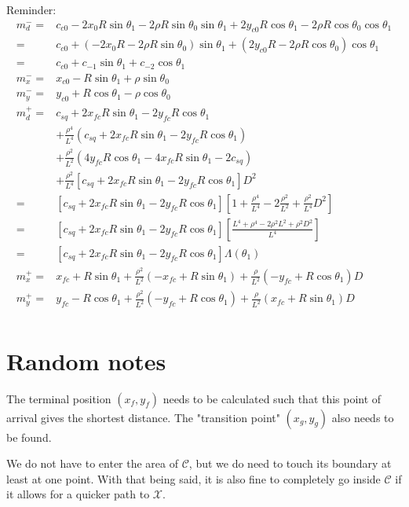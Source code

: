 \documentclass[12pt]{article}
\begin{document}
Reminder:
\begin{align}
    m_d^- =& c_{c0} - 2x_0R\sin\theta_1 - 2\rho R\sin\theta_0\sin\theta_1 + 2y_{c0}R\cos\theta_1 -2\rho R\cos\theta_0\cos\theta_1\\
    =& c_{c0} +(- 2x_0R - 2\rho R\sin\theta_0)\sin\theta_1 + (2y_{c0}R -2\rho R\cos\theta_0)\cos\theta_1\\
    =& c_{c0} +c_{-1}\sin\theta_1 + c_{-2}\cos\theta_1\\
    m^-_x =& x_{c0} -R\sin\theta_1 +\rho\sin\theta_0\\
    m^-_y =& y_{c0} + R\cos\theta_1 - \rho\cos\theta_0\\
    m_d^+ =& c_{sq} +2x_{fc}R\sin\theta_1  -2y_{fc}R\cos\theta_1 \nonumber\\
    &+   \frac{\rho^4}{L^4} (c_{sq} + 2x_{fc}R\sin\theta_1 -2y_{fc}R\cos\theta_1) \nonumber\\
    &+ \frac{\rho^2}{L^2} ( 4y_{fc} R\cos\theta_1  - 4x_{fc} R\sin\theta_1 -2c_{sq} ) \nonumber\\
    &+\frac{\rho^2}{L^4}[ c_{sq} + 2x_{fc}R\sin\theta_1  -2y_{fc}R\cos\theta_1  ]D^2\\
    =& [c_{sq} +2x_{fc}R\sin\theta_1  -2y_{fc}R\cos\theta_1][ 1 + \frac{\rho^4}{L^4} - 2\frac{\rho^2}{L^2} + \frac{\rho^2}{L^4}D^2] \\
    =& [c_{sq} +2x_{fc}R\sin\theta_1  -2y_{fc}R\cos\theta_1][ \frac{L^4 + \rho^4 -2\rho^2L^2 + \rho^2D^2}{L^4}] \\
    =& [c_{sq} +2x_{fc}R\sin\theta_1  -2y_{fc}R\cos\theta_1]\Lambda(\theta_1)\\
    m^+_x =& x_{fc} +R\sin\theta_1 +\frac{\rho^2}{L^2}(-x_{fc} + R\sin\theta_1) + \frac{\rho}{L^2}(-y_{fc} +R\cos\theta_1)D\\
    m^+_y =& y_{fc} -R\cos\theta_1 +\frac{\rho^2}{L^2}( -y_{fc} +R\cos\theta_1) + \frac{\rho}{L^2}(x_{fc} + R\sin\theta_1)D \\
\end{align}



\section{Random notes}

The terminal position $(x_f,y_f)$ needs to be calculated such that this point of arrival gives the shortest distance. The "transition point" $(x_g,y_g)$ also needs to be found.

We do not have to enter the area of $\mathcal{C}$, but we do need to touch its boundary at least at one point. With that being said, it is also fine to completely go inside $\mathcal{C}$ if it allows for a quicker path to $\mathcal{X}$.
\end{document}
